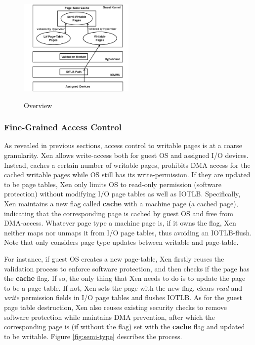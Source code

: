 \begin{figure}[ht]
\centering
\includegraphics[width=0.5\textwidth]{image/overview/overview.png} \\
\caption{Overview}
\label{fig:overview}
\end{figure}

\subsubsection{Fine-Grained Access Control}
As revealed in previous sections, access control to writable pages is at a coarse granularity. Xen allows write-access both for guest OS and assigned I/O devices. Instead, \name caches a certain number of writable pages, prohibits DMA access for the cached writable pages while OS still has its write-permission. If they are updated to be page tables, Xen only limits OS to read-only permission (software protection) without modifying I/O page tables as well as IOTLB. Specifically, Xen maintains a new flag called \textbf{cache} with a machine page (a cached page), indicating that the corresponding page is cached by guest OS and free from DMA-access. Whatever page type a machine page is, if it owns the flag, Xen neither maps nor unmaps it from I/O page tables, thus avoiding an IOTLB-flush. Note that \name only considers page type updates between writable and page-table.

For instance, if guest OS creates a new page-table, Xen firstly reuses the validation process to enforce software protection, and then checks if the page has the \textbf{cache} flag. If so, the only thing that Xen needs to do is to update the page to be a page-table. If not, Xen sets the page with the new flag, clears \emph{read} and \emph{write} permission fields in I/O page tables and flushes IOTLB. As for the guest page table destruction, Xen also reuses existing security checks to remove software protection while maintains DMA prevention, after which the corresponding page is (if without the flag) set with the \textbf{cache} flag and updated to be writable. Figure \ref{fig:semi-type} describes the process.

